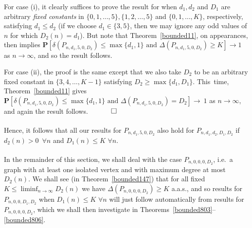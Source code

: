 \documentclass{article}
\newtheorem{Proof of Theorem}{Proof of Theorem}
\begin{document}
For case (i),
it clearly suffices to prove the result for when $d_{1},d_{2}$ and $D_{1}$
are arbitrary \textit{fixed constants} in
$\{ 0,1, \ldots, 5 \}, \{ 1,2, \ldots, 5 \}$ and $\{ 0,1, \ldots, K \}$,
respectively, satisfying $d_{1} \leq d_{2}$
(if we choose $d_{1} \in \{ 3,5 \}$,
then we may ignore any odd values of $n$ for which $D_{2}(n) = d_{1}$).
But note that Theorem~\ref{bounded11},
on appearances,
then implies
$\mathbf{P}
[\delta(P_{n,d_{1},5,0,D_{2}}) \leq \max \{ d_{1},1 \} \textrm{ and } \Delta(P_{n,d_{1},5,0,D_{2}}) \geq K] \to 1$
as $n \to \infty$,
and so the result follows.

For case (ii),
the proof is the same except that we also take $D_{2}$ to be an arbitrary fixed constant in $\{ 3,4, \ldots, K-1 \}$
satisfying $D_{2} \geq \max \{ d_{1}, D_{1} \}$.
This~time,
Theorem~\ref{bounded11} gives
$\mathbf{P}
[\delta(P_{n,d_{1},5,0,D_{2}}) \leq \max \{ d_{1},1 \} \textrm{ and } \Delta(P_{n,d_{1},5,0,D_{2}}) = D_{2}] \to~\!1$
as $n \to \infty$,
and again the result follows.
$\phantom{qwerty} 
\setlength{\unitlength}{.25cm}
\begin{picture}(1,1)
\put(0,0){\line(1,0){1}}
\put(0,0){\line(0,1){1}}
\put(1,1){\line(-1,0){1}}
\put(1,1){\line(0,-1){1}}
\end{picture}$ \\
\\















Hence, it follows that
all our results for $P_{n,d_{1},5,0,D_{2}}$ also hold for $P_{n,d_{1},d_{2},D_{1},D_{2}}$
if $d_{2}(n) > 0$~$\forall n$ and $D_{1}(n) \leq K$ $\forall n$. \\
\\






In the remainder of this section,
we shall deal with the case $P_{n,0,0,0,D_{2}}$,
i.e.~a graph with at least one isolated vertex and with maximum degree at most $D_{2}(n)$.
We shall see (in Theorem~\ref{bounded147}) that for all fixed $K \leq \liminf_{n \to \infty} D_{2}(n)$ we have
$\Delta(P_{n,0,0,0,D_{2}}) \geq K$ a.a.s.,
and so results for $P_{n,0,0,D_{1},D_{2}}$ when $D_{1}(n) \leq K$ $\forall n$ will just follow automatically
from results for $P_{n,0,0,0,D_{2}}$,
which we shall then investigate in Theorems~\ref{bounded803}--\ref{bounded806}. \\
\\
\end{document}
